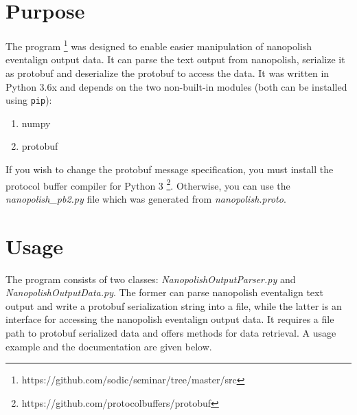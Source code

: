 \documentclass[times, utf, seminar]{fer}
\begin{document}
\section{Purpose}
The program 
\footnote{https://github.com/sodic/seminar/tree/master/src}
was designed to enable easier manipulation of nanopolish eventalign 
output data. It can parse the text output from nanopolish, serialize it as protobuf and 
deserialize the protobuf to access the data. It was written in Python 3.6x and
depends on the two non-built-in modules (both can be installed using \texttt{pip}):
\begin{enumerate}
	\item numpy
	\item protobuf
\end{enumerate}
 If you wish to change the protobuf message
specification, you must install the protocol buffer compiler for Python 3
\footnote{https://github.com/protocolbuffers/protobuf}.
Otherwise, you can use the \textit{nanopolish\_pb2.py} file which was generated from
\textit{nanopolish.proto}.

\section{Usage}
The program consists of two classes: \textit{NanopolishOutputParser.py} and 
\textit{NanopolishOutputData.py}. The former can parse nanopolish 
eventalign text output and write a protobuf serialization string into a file, while
the latter is an interface for accessing the nanopolish eventalign output data. It requires 
a file path to protobuf serialized data and offers methods for data retrieval. 
A usage example and the documentation are given below. 


 
\end{document}
